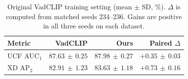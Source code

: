 \begin{table}[t]
\centering
\caption{Original VadCLIP training setting (mean $\pm$ SD, \%). $\Delta$ is computed from matched seeds 234--236. Gains are positive in all three seeds on each dataset.}
\label{tab:official}
\small\setlength{\tabcolsep}{3pt}
\begin{tabular}{lrrr}\toprule
Metric & VadCLIP & Ours & Paired $\Delta$\\\midrule
UCF AUC$_1$ & $87.63\,\pm\,0.25$ & $87.98\,\pm\,0.27$ & $+0.35\,\pm\,0.03$ \\
XD AP$_2$ & $82.91\,\pm\,1.23$ & $83.63\,\pm\,1.18$ & $+0.73\,\pm\,0.16$ \\
\bottomrule\end{tabular}\end{table}
